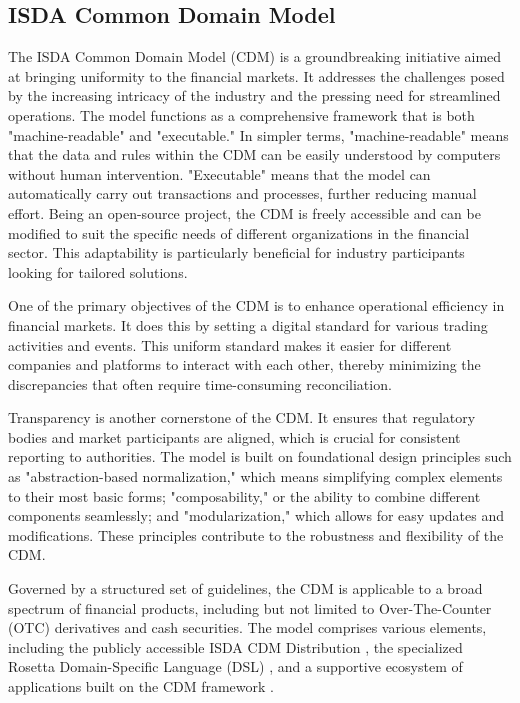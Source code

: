 \subsection{ISDA Common Domain Model}
\label{subsec:cdm}
The ISDA Common Domain Model (CDM) \citep{isda_cdm_factsheet} is a groundbreaking initiative aimed at bringing uniformity to the financial markets. It addresses the challenges posed by the increasing intricacy of the industry and the pressing need for streamlined operations. The model functions as a comprehensive framework that is both "machine-readable" and "executable." In simpler terms, "machine-readable" means that the data and rules within the CDM can be easily understood by computers without human intervention. "Executable" means that the model can automatically carry out transactions and processes, further reducing manual effort. Being an open-source project, the CDM is freely accessible and can be modified to suit the specific needs of different organizations in the financial sector. This adaptability is particularly beneficial for industry participants looking for tailored solutions. 

One of the primary objectives of the CDM is to enhance operational efficiency in financial markets. It does this by setting a digital standard for various trading activities and events. This uniform standard makes it easier for different companies and platforms to interact with each other, thereby minimizing the discrepancies that often require time-consuming reconciliation.

Transparency is another cornerstone of the CDM. It ensures that regulatory bodies and market participants are aligned, which is crucial for consistent reporting to authorities. The model is built on foundational design principles such as "abstraction-based normalization," which means simplifying complex elements to their most basic forms; "composability," or the ability to combine different components seamlessly; and "modularization," which allows for easy updates and modifications. These principles contribute to the robustness and flexibility of the CDM.

Governed by a structured set of guidelines, the CDM is applicable to a broad spectrum of financial products, including but not limited to Over-The-Counter (OTC) derivatives and cash securities. The model comprises various elements, including the publicly accessible ISDA CDM Distribution \citep{cdm_distribution_github}, the specialized Rosetta Domain-Specific Language (DSL) \citep{rosetta_dsl}, and a supportive ecosystem of applications built on the CDM framework \citep{applications_cdm}.